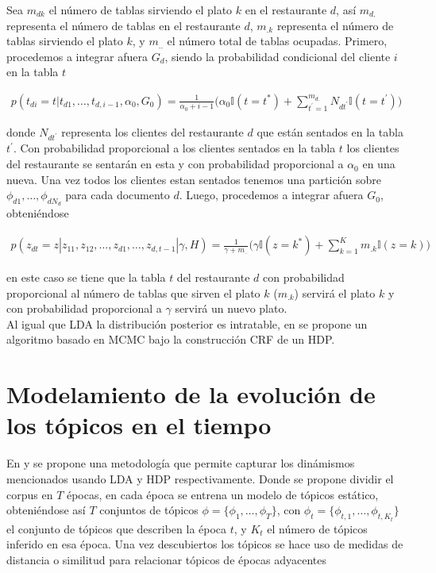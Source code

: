 \documentclass[letterpaper,12pt,oneside]{book} %
\begin{document}
Sea $m_{dk}$ el número de tablas sirviendo el plato $k$ en el restaurante $d$, así $m_{d.}$ representa el número de tablas en el restaurante $d$, $m_{.k}$ representa el número de tablas sirviendo el plato $k$, y $m_{..}$ el número total de tablas ocupadas. Primero, procedemos a integrar afuera $G_{d}$, siendo la probabilidad condicional del cliente $i$ en la tabla $t$

\begin{align}
p(t_{di}=t|t_{d1}, \ldots, t_{d,i-1}, \alpha_{0}, G_{0}) = \frac{1}{\alpha_{0}+i-1}\bigg(\alpha_{0}\mathbb{I}(t=t^{*})+\sum_{t^{'}=1}^{m_{d.}}N_{dt^{'}}\mathbb{I}(t=t^{'})\bigg)
\end{align}

donde $N_{dt^{'}}$ representa los clientes del restaurante $d$ que están sentados en la tabla $t^{'}$. Con probabilidad proporcional a los clientes sentados en la tabla $t$ los clientes del restaurante se sentarán en esta y con probabilidad proporcional a $\alpha_{0}$ en una nueva. Una vez todos los clientes estan sentados tenemos una partición sobre $\phi_{d1}, \ldots, \phi_{dN_{d}}$ para cada documento $d$. Luego, procedemos a integrar afuera $G_{0}$, obteniéndose

\begin{align}
    p(z_{dt}=z|z_{11}, z_{12}, \ldots, z_{d1}, \ldots, z_{d, t-1}|\gamma, H) = \frac{1}{\gamma+m_{..}}\bigg(\gamma\mathbb{I}(z=k^{*})+\sum_{k=1}^{K}m_{.k}\mathbb{I}(z=k)\bigg)
\end{align}

en este caso se tiene que la tabla $t$ del restaurante $d$ con probabilidad proporcional al número de tablas que sirven el plato $k$ ($m_{.k}$) servirá el plato $k$ y con probabilidad proporcional a $\gamma$ servirá un nuevo plato.\\

Al igual que LDA la distribución posterior es intratable, en  \citep{teh2005sharing} se propone un algoritmo basado en MCMC bajo la construcción CRF de un HDP. 

\section{Modelamiento de la evolución de los tópicos en el tiempo}
\label{sec:topic_evolution} 

En \citep{wilson2011tracking} y \citep{beykikhoshk2018discovering} se propone una metodología que permite capturar los dinámismos mencionados usando LDA y HDP respectivamente. Donde se propone dividir el corpus en $T$ épocas, en cada época se entrena un modelo de tópicos estático, obteniéndose así $T$ conjuntos de tópicos $\phi=\{\phi_{1}, \ldots, \phi_{T}\}$, con $\phi_{t}=\{\phi_{t,1}, \ldots, \phi_{t,K_{t}}\}$ el conjunto de tópicos que describen la época $t$, y $K_{t}$ el número de tópicos inferido en esa época. Una vez descubiertos los tópicos se hace uso de medidas de distancia o similitud para relacionar tópicos de épocas adyacentes \\
\end{document}
